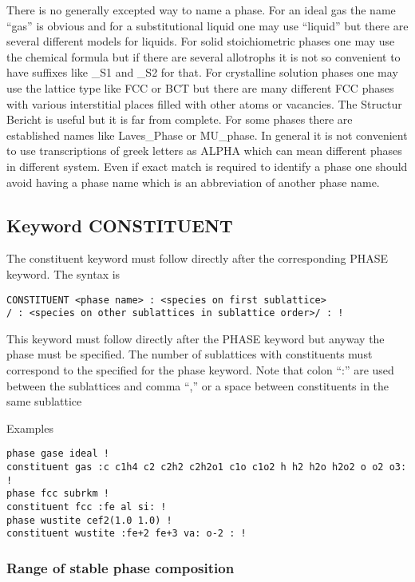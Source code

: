 \documentclass[12pt]{article}
\begin{document}
There is no generally excepted way to name a phase.  For an ideal gas
the name ``gas'' is obvious and for a substitutional liquid one may
use ``liquid'' but there are several different models for liquids.
For solid stoichiometric phases one may use the chemical formula but
if there are several allotrophs it is not so convenient to have
suffixes like \_S1 and \_S2 for that.  For crystalline solution phases
one may use the lattice type like FCC or BCT but there are many
different FCC phases with various interstitial places filled with
other atoms or vacancies.  The Structur Bericht is useful but it is
far from complete.  For some phases there are established names like
Laves\_Phase or MU\_phase.  In general it is not convenient to use
transcriptions of greek letters as ALPHA which can mean different
phases in different system.  Even if exact match is required to identify
a phase one should avoid having a phase name which is an abbreviation
of another phase name.


\subsection{Keyword CONSTITUENT}\label{sec:const}

The constituent keyword must follow directly after the corresponding
PHASE keyword.  The syntax is

\begin{verbatim}
CONSTITUENT <phase name> : <species on first sublattice> 
/ : <species on other sublattices in sublattice order>/ : !
\end{verbatim}

This keyword must follow directly after the PHASE keyword but anyway
the phase must be specified.  The number of sublattices with
constituents must correspond to the specified for the phase keyword.
Note that colon ``:'' are used between the sublattices and comma ``,''
or a space between constituents in the same sublattice

Examples

\begin{verbatim}
phase gase ideal !
constituent gas :c c1h4 c2 c2h2 c2h2o1 c1o c1o2 h h2 h2o h2o2 o o2 o3: !
phase fcc subrkm !
constituent fcc :fe al si: !
phase wustite cef2(1.0 1.0) !
constituent wustite :fe+2 fe+3 va: o-2 : !
\end{verbatim}

\subsubsection{Range of stable phase composition}\label{sec:phaserange}
\end{document}

